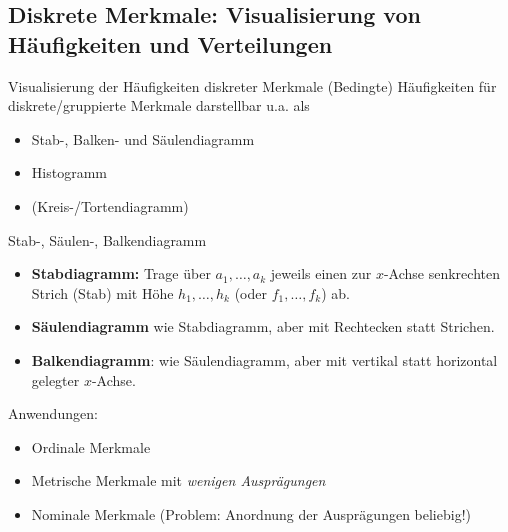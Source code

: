 \documentclass[
  10pt,
  ignorenonframetext,
]{beamer}
\providecommand{\tightlist}{%
  \setlength{\itemsep}{0pt}\setlength{\parskip}{0pt}}
\begin{document}
\subsection{Diskrete Merkmale: Visualisierung von Häufigkeiten und
Verteilungen}\label{diskrete-merkmale-visualisierung-von-huxe4ufigkeiten-und-verteilungen}

\begin{frame}{Visualisierung der Häufigkeiten diskreter Merkmale}
\label{visualisierung-der-huxe4ufigkeiten-diskreter-merkmale}
(Bedingte) Häufigkeiten für diskrete/gruppierte Merkmale darstellbar
u.a. als

\begin{itemize}
\tightlist
\item
  Stab-, Balken- und Säulendiagramm
\item
  Histogramm
\item
  (Kreis-/Tortendiagramm)
\end{itemize}
\end{frame}

\begin{frame}{Stab-, Säulen-, Balkendiagramm}
\label{stab--suxe4ulen--balkendiagramm}
\begin{itemize}
\tightlist
\item
  \textbf{Stabdiagramm:} Trage über \(a_1 , \ldots ,a_k\) jeweils einen
  zur \(x\)-Achse senkrechten Strich (Stab) mit Höhe
  \(h_1 , \ldots , h_k\) (oder \(f_1 , \ldots , f_k\)) ab.
\item
  \textbf{Säulendiagramm} wie Stabdiagramm, aber mit Rechtecken statt
  Strichen.
\item
  \textbf{Balkendiagramm}: wie Säulendiagramm, aber mit vertikal statt
  horizontal gelegter \(x\)-Achse.
\end{itemize}

Anwendungen:

\begin{itemize}
\tightlist
\item
  Ordinale Merkmale
\item
  Metrische Merkmale mit \emph{wenigen Ausprägungen}
\item
  Nominale Merkmale (Problem: Anordnung der Ausprägungen beliebig!)
\end{itemize}
\end{frame}
\end{document}
